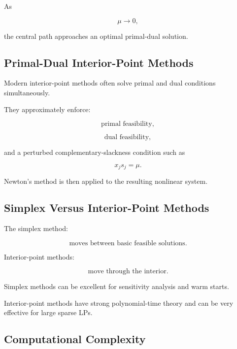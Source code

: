 As

\[
\boxed{
\mu\to0,
}
\]

the central path approaches an optimal primal-dual solution.

\subsection{Primal-Dual Interior-Point Methods}
\label{subsec:primal-dual-interior-point}

Modern interior-point methods often solve primal and dual conditions
simultaneously.

They approximately enforce:

\[
\boxed{
\text{primal feasibility},
}
\]

\[
\boxed{
\text{dual feasibility},
}
\]

and a perturbed complementary-slackness condition such as

\[
\boxed{
x_js_j
=
\mu.
}
\]

Newton's method is then applied to the resulting nonlinear system.

\subsection{Simplex Versus Interior-Point Methods}
\label{subsec:simplex-versus-interior-point}

The simplex method:

\[
\boxed{
\text{moves between basic feasible solutions}.
}
\]

Interior-point methods:

\[
\boxed{
\text{move through the interior}.
}
\]

Simplex methods can be excellent for sensitivity analysis and warm starts.

Interior-point methods have strong polynomial-time theory and can be very
effective for large sparse LPs.

\subsection{Computational Complexity}
\label{subsec:lp-computational-complexity}

